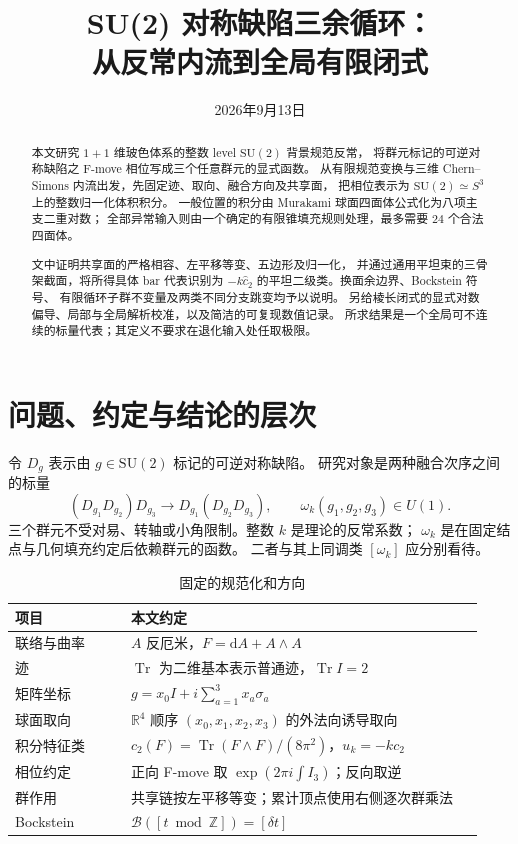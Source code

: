 \documentclass[UTF8,11pt,fontset=none]{ctexart}
\title{SU(2) 对称缺陷三余循环：\\从反常内流到全局有限闭式}
\author{}
\date{2026年9月13日}
\numberwithin{equation}{section}
\theoremstyle{definition}
\DeclareMathOperator{\Tr}{Tr}
\newcommand{\R}{\mathbb R}
\newcommand{\Z}{\mathbb Z}
\newcommand{\dd}{\mathrm d}
\newcommand{\SU}{\mathrm{SU}(2)}
\newcommand{\Id}{I}
\begin{document}
\maketitle
\begin{abstract}
本文研究 $1+1$ 维玻色体系的整数 level $\SU$ 背景规范反常，
将群元标记的可逆对称缺陷之 F-move 相位写成三个任意群元的显式函数。
从有限规范变换与三维 Chern--Simons 内流出发，先固定迹、取向、融合方向及共享面，
把相位表示为 $\SU\simeq S^3$ 上的整数归一化体积积分。
一般位置的积分由 Murakami 球面四面体公式化为八项主支二重对数；
全部异常输入则由一个确定的有限锥填充规则处理，最多需要 $24$ 个合法四面体。

文中证明共享面的严格相容、左平移等变、五边形及归一化，
并通过通用平坦束的三骨架截面，将所得具体 bar 代表识别为
$-k\widehat c_2$ 的平坦二级类。换面余边界、Bockstein 符号、
有限循环子群不变量及两类不同分支跳变均予以说明。
另给棱长闭式的显式对数偏导、局部与全局解析校准，以及简洁的可复现数值记录。
所求结果是一个全局可不连续的标量代表；其定义不要求在退化输入处任取极限。
\end{abstract}

\tableofcontents
\clearpage
\fi

\section{问题、约定与结论的层次}\label{sec:conventions}

令 $D_g$ 表示由 $g\in\SU$ 标记的可逆对称缺陷。
研究对象是两种融合次序之间的标量
\begin{equation}
 (D_{g_1}D_{g_2})D_{g_3}
 \longrightarrow D_{g_1}(D_{g_2}D_{g_3}),
 \qquad \omega_k(g_1,g_2,g_3)\in U(1).
 \label{eq:fmove-direction}
\end{equation}
三个群元不受对易、转轴或小角限制。整数 $k$ 是理论的反常系数；
$\omega_k$ 是在固定结点与几何填充约定后依赖群元的函数。
二者与其上同调类 $[\omega_k]$ 应分别看待。

\begin{table}[htbp]
\centering
\caption{固定的规范化和方向}
\begin{tabular}{@{}p{0.23\linewidth}p{0.70\linewidth}@{}}
\toprule
项目 & 本文约定\\
\midrule
联络与曲率 & $A$ 反厄米，$F=\dd A+A\wedge A$\\
迹 & $\Tr$ 为二维基本表示普通迹，$\Tr\Id=2$\\
矩阵坐标 & $g=x_0\Id+i\sum_{a=1}^3x_a\sigma_a$\\
球面取向 & $\R^4$ 顺序 $(x_0,x_1,x_2,x_3)$ 的外法向诱导取向\\
积分特征类 & $c_2(F)=\Tr(F\wedge F)/(8\pi^2)$，$u_k=-kc_2$\\
相位约定 & 正向 F-move 取 $\exp(2\pi i\int I_3)$；反向取逆\\
群作用 & 共享链按左平移等变；累计顶点使用右侧逐次群乘法\\
Bockstein & $\mathcal B([t\bmod\Z])=[\delta t]$\\
\bottomrule
\end{tabular}
\end{table}
\end{document}
